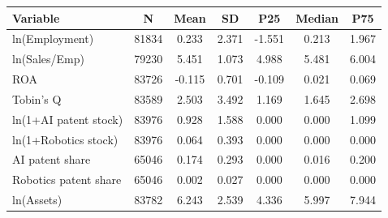 \begin{tabular}{lcccccc}
\toprule
Variable & N & Mean & SD & P25 & Median & P75 \\
\midrule
ln(Employment) & 81834 & 0.233 & 2.371 & -1.551 & 0.213 & 1.967 \\
ln(Sales/Emp) & 79230 & 5.451 & 1.073 & 4.988 & 5.481 & 6.004 \\
ROA & 83726 & -0.115 & 0.701 & -0.109 & 0.021 & 0.069 \\
Tobin's Q & 83589 & 2.503 & 3.492 & 1.169 & 1.645 & 2.698 \\
ln(1+AI patent stock) & 83976 & 0.928 & 1.588 & 0.000 & 0.000 & 1.099 \\
ln(1+Robotics stock) & 83976 & 0.064 & 0.393 & 0.000 & 0.000 & 0.000 \\
AI patent share & 65046 & 0.174 & 0.293 & 0.000 & 0.016 & 0.200 \\
Robotics patent share & 65046 & 0.002 & 0.027 & 0.000 & 0.000 & 0.000 \\
ln(Assets) & 83782 & 6.243 & 2.539 & 4.336 & 5.997 & 7.944 \\
\bottomrule
\end{tabular}